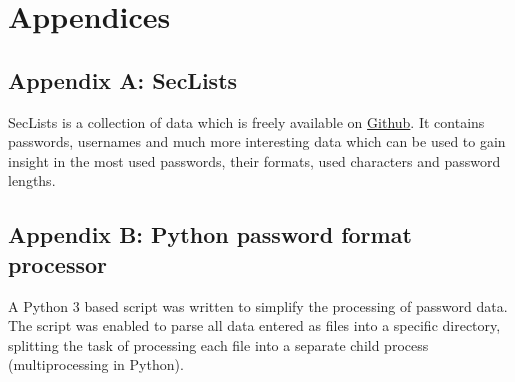 \documentclass[a4paper,12pt]{article}
\begin{document}
\newpage
\section{Appendices}

\subsection{Appendix A: SecLists}
\label{app:secl}

SecLists is a collection of data which is freely available on \href{https://github.com/danielmiessler/SecLists/}{Github}. It contains passwords, usernames and much more interesting data which can be used to gain insight in the most used passwords, their formats, used characters and password lengths.

\subsection{Appendix B: Python password format processor}
\label{app:pyprocc}

A Python 3 based script was written to simplify the processing of password data. The script was enabled to parse all data entered as files into a specific directory, splitting the task of processing each file into a separate child process (multiprocessing in Python). 
\end{document}
